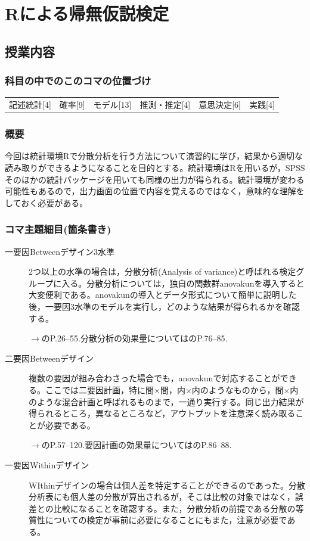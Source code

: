 \section{Rによる帰無仮説検定}
\label{D1_lesson22}

\subsection{授業内容}
\subsubsection{科目の中でのこのコマの位置づけ}
\begin{tabular}[t]{cccccc}
    記述統計[4] & 確率[9] & モデル[13] & 推測・推定[4] & 意思決定[6] & 実践[4]
\end{tabular}

\subsubsection{概要}
今回は統計環境Rで分散分析を行う方法について演習的に学び，結果から適切な読み取りができるようになることを目的とする。統計環境はRを用いるが，SPSSそのほかの統計パッケージを用いても同様の出力が得られる。統計環境が変わる可能性もあるので，出力画面の位置で内容を覚えるのではなく，意味的な理解をしておく必要がある。
\subsubsection{コマ主題細目(箇条書き)}
\begin{description}

\item[一要因Betweenデザイン3水準]2つ以上の水準の場合は，分散分析(Analysis of variance)と呼ばれる検定グループに入る。分散分析については，独自の関数群anovakunを導入すると大変便利である。anovakunの導入とデータ形式について簡単に説明した後，一要因3水準のモデルを実行し，どのような結果が得られるかを確認する。

\begin{flushright}
    $\to$\citet{橋本201607}のP.26--55.分散分析の効果量については\citet{大久保201201}のP.76--85.
\end{flushright}

\item[二要因Betweenデザイン]複数の要因が組み合わさった場合でも，anovakunで対応することができる。ここでは二要因計画，特に間$\times$間，内$\times$内のようなものから，間$\times$内のような混合計画と呼ばれるものまで，一通り実行する。同じ出力結果が得られるところ，異なるところなど，アウトプットを注意深く読み取ることが必要である。

\begin{flushright}
    $\to$\citet{橋本201607}のP.57--120.要因計画の効果量については\citet{大久保201201}のP.86--88.
\end{flushright}

\item[一要因Withinデザイン]WIthinデザインの場合は個人差を特定することができるのであった。分散分析表にも個人差の分散が算出されるが，そこは比較の対象ではなく，誤差との比較になることを確認する。また，分散分析の前提である分散の等質性についての検定が事前に必要になることにもまた，注意が必要である。

\end{description}
